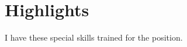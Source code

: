 \documentclass[letter,10pt]{article}
\begin{document}

\section{Highlights}
I have these special skills trained for the position.
\end{document}
